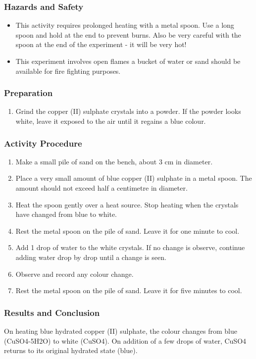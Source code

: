 \subsubsection*{Hazards and Safety}
\begin{itemize}
\item{This activity requires prolonged heating with a metal spoon. Use a long spoon and hold at the end to prevent burns. Also be very careful with the spoon at the end of the experiment - it will be very hot!}
\item{This experiment involves open flames a bucket of water or sand should be available for fire fighting purposes.}
\end{itemize}

\subsubsection*{Preparation}
\begin{enumerate}
\item{Grind the copper (II) sulphate crystals into a powder. If the powder looks white, leave it exposed to the air until it regains a blue colour.}
\end{enumerate}

\subsubsection*{Activity Procedure}
\begin{enumerate}
\item{Make a small pile of sand on the bench, about 3 cm in diameter.}
\item{Place a very small amount of blue copper (II) sulphate in a metal spoon. The amount should not exceed half a centimetre in diameter.}
\item{Heat the spoon gently over a heat source. Stop heating when the crystals have changed from blue to white.}
\item{Rest the metal spoon on the pile of sand. Leave it for one minute to cool.}
\item{Add 1 drop of water to the white crystals. If no change is observe, continue adding water drop by drop until a change is seen.}
\item{Observe and record any colour change.}
\item{Rest the metal spoon on the pile of sand. Leave it for five minutes to cool.}
\end{enumerate}

\subsubsection*{Results and Conclusion}
On heating blue hydrated copper (II) sulphate, the colour changes from blue (CuSO4-5H2O) to white (CuSO4). On addition of a few drops of water, CuSO4 returns to its original hydrated state (blue).


